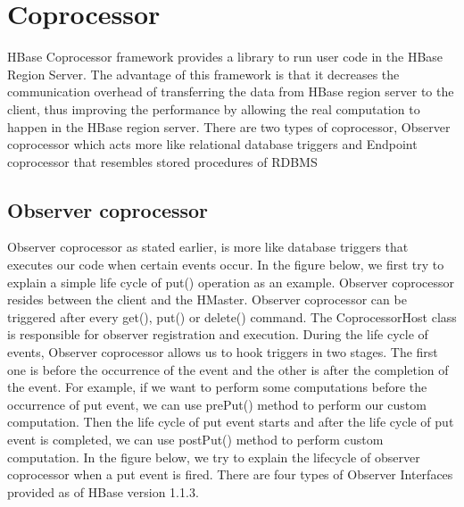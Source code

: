 \documentclass[11pt,a4paper,bibtotoc,idxtotoc,headsepline,footsepline,footexclude,BCOR12mm,DIV13]{scrbook}
\begin{document}
\section{Coprocessor}
\label{sec:coprocessor}

HBase Coprocessor framework provides a library to run user code in the HBase Region Server. The advantage of this framework is that it decreases the communication overhead of transferring the data from HBase region server to the client, thus improving the performance by allowing the real computation to happen in the HBase region server\cite{coprocessor:coprocessor}. There are two types of coprocessor, Observer coprocessor  which acts more like relational database triggers and Endpoint coprocessor that resembles stored procedures of RDBMS\cite{coprocessor:types} 


\subsection{Observer coprocessor}
\label{sec:observercoprocessor}
Observer coprocessor as stated earlier, is more like database triggers that executes our code when certain events occur. In the figure below, we first try to explain a simple life cycle of put() operation as an example\cite{coprocessor:detail}. Observer coprocessor resides between the client and the HMaster. Observer coprocessor can be triggered after every get(), put() or delete() command. The CoprocessorHost class is responsible for observer registration and execution\cite{coprocessor:detail}.  During the life cycle of events, Observer coprocessor allows us to hook triggers in two stages. The first one is before the occurrence of the event and the other is after the completion of the event. For example, if we want to perform some computations before the occurrence of put event, we can use prePut() method to perform our custom computation. Then the life cycle of put event starts and after the life cycle of put event is completed, we can use postPut() method to perform custom computation. In the figure below, we try to explain the lifecycle of observer coprocessor when a put event is fired\cite{coprocessor:detail}.
\newline
There are four types of Observer Interfaces provided as of HBase version 1.1.3\cite{hbase:essential}.
\end{document}
